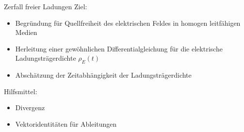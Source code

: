 \documentclass[fleqn,aspectratio=169]{beamer}
\begin{document}
\begin{frame}{Zerfall freier Ladungen}
    Ziel:
    \begin{itemize}
        \item Begründung für Quellfreiheit des elektrischen Feldes in homogen leitfähigen Medien
        \item Herleitung einer gewöhnlichen Differentialgleichung für die elektrische Ladungsträgerdichte $\rho_E(t)$
        \item Abschätzung der Zeitabhängigkeit der Ladungsträgerdichte
    \end{itemize}
    Hilfsmittel:
    \begin{itemize}
        \item Divergenz
        \item Vektoridentitäten für Ableitungen
    \end{itemize}

\end{frame}
\end{document}
